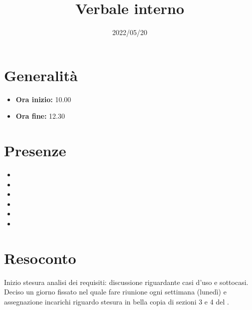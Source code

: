 \documentclass{classes/base}
\title{Verbale interno}
\date{2022/05/20}
\author{\marcob}
\renewcommand{\maketitle}{
    
}
\begin{document}
    \maketitle

    \section*{Generalità}
    \begin{itemize}
        \item \textbf{Ora inizio:} 10.00
        \item \textbf{Ora fine:} 12.30
    \end{itemize}

    \section*{Presenze}
    \begin{itemize}
        \item \tommaso
        \item \marcob
        \item \marcov
        \item \angela
        \item \giulio
        \item \ruth
    \end{itemize}

    \section*{Resoconto}
    Inizio stesura analisi dei requisiti: discussione riguardante casi d'uso e sottocasi.\\
    Deciso un giorno fissato nel quale fare riunione ogni settimana (lunedì) e assegnazione incarichi riguardo
    stesura in bella copia di sezioni 3 e 4 del \PdP.
\end{document}
